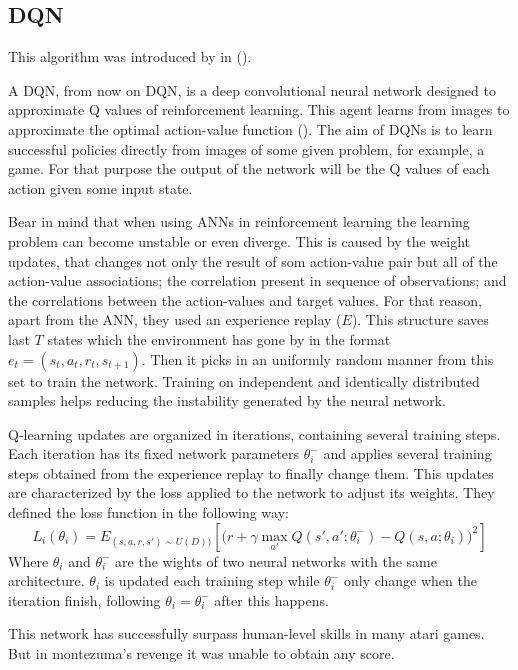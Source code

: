 \subsection{\acl{DQN}}
This algorithm was introduced by \citeauthor{mnih2015human} in  (\citeyear{mnih2015human}).

A \acl{DQN}, from now on \ac{DQN}, is a deep convolutional neural network designed to approximate Q values of reinforcement learning.
This agent learns from images to approximate the optimal action-value function ().
The aim of \acp{DQN} is to learn successful policies directly from images of some given problem, for example, a game.
For that purpose the output of the network will be the Q values of each action given some input state.

Bear in mind that when using \acp{ANN} in reinforcement learning the learning problem can become unstable or even diverge.
This is caused by the weight updates, that changes not only the result of som action-value pair but all of the action-value associations;
the correlation present in sequence of observations;
and the correlations between the action-values and target values.
For that reason, apart from the \ac{ANN}, they used an experience replay ($E$).
This structure saves last $T$ states which the environment has gone by in the format $e_t=(s_t ,a_t , r_t , s_{t+1})$.
Then it picks in an uniformly random manner from this set to train the network.
Training on independent and identically distributed samples helps reducing the instability generated by the neural network.

Q-learning updates are organized in iterations, containing several training steps.
Each iteration has its fixed network
parameters $\theta^-_i$ and applies several training steps obtained from the experience replay to finally change them.
This updates are characterized by the loss applied to the network to adjust its weights.
They defined the loss function in the following way:
\begin{equation}
    L_i(\theta_i)=E_{(s,a,r,s') \sim U(D))} \left [ \bigg(r+\gamma \max_{a'}Q(s',a';\theta_i^-)-Q(s,a;\theta_i)\bigg )^2\right ]
\end{equation}
Where $\theta_i$ and $\theta^-_i$ are the wights of two neural networks with the same architecture.
$\theta_i$ is updated each training step while $\theta^-_i$ only change when the iteration finish, following
$\theta_i = \theta^-_i$ after this happens.

This network has successfully surpass human-level skills in many atari games.
But in montezuma's revenge it was unable to obtain any score.

